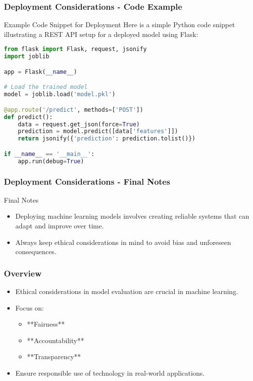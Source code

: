 \documentclass[aspectratio=169]{beamer}
\begin{document}
\begin{frame}[fragile]
    \frametitle{Deployment Considerations - Code Example}
    \begin{block}{Example Code Snippet for Deployment}
        Here is a simple Python code snippet illustrating a REST API setup for a deployed model using Flask:
        \begin{lstlisting}[language=Python]
from flask import Flask, request, jsonify
import joblib

app = Flask(__name__)

# Load the trained model
model = joblib.load('model.pkl')

@app.route('/predict', methods=['POST'])
def predict():
    data = request.get_json(force=True)
    prediction = model.predict([data['features']])
    return jsonify({'prediction': prediction.tolist()})

if __name__ == '__main__':
    app.run(debug=True)
        \end{lstlisting}
    \end{block}
\end{frame}

\begin{frame}[fragile]
    \frametitle{Deployment Considerations - Final Notes}
    \begin{block}{Final Notes}
        \begin{itemize}
            \item Deploying machine learning models involves creating reliable systems that can adapt and improve over time.
            \item Always keep ethical considerations in mind to avoid bias and unforeseen consequences.
        \end{itemize}
    \end{block}
\end{frame}

\begin{frame}
    \titlepage
\end{frame}

\begin{frame}
    \frametitle{Overview}
    \begin{itemize}
        \item Ethical considerations in model evaluation are crucial in machine learning.
        \item Focus on:
        \begin{itemize}
            \item **Fairness**
            \item **Accountability**
            \item **Transparency**
        \end{itemize}
        \item Ensure responsible use of technology in real-world applications.
    \end{itemize}
\end{frame}
\end{document}
